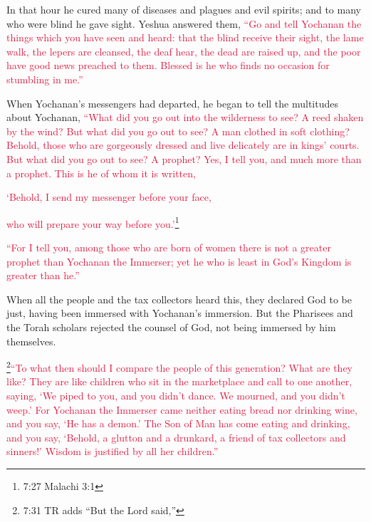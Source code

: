 \myverse{}In that hour he cured many of diseases and plagues and evil spirits;
and to many who were blind he gave sight.
\myverse{}Yeshua answered them,
\textcolor{crimson}{“Go and tell Yochanan the things which you have seen and heard: that the blind receive their sight,
	the lame walk, the lepers are cleansed, the deaf hear, the dead are raised up, and the poor have good
	news preached to them.
}
\myverse{}\textcolor{crimson}{Blessed is he who finds no occasion for stumbling in me.”}

\myverse{}When Yochanan’s messengers had departed, he began to tell the
multitudes about Yochanan,
\textcolor{crimson}{“What did you go out into the wilderness to see? A reed shaken by the wind?
}
\myverse{}\textcolor{crimson}{But what did you go out to see? A man clothed in soft clothing? Behold,
	those who are gorgeously dressed and live delicately are in kings’ courts.
}
\myverse{}\textcolor{crimson}{But what did you go out to see? A prophet? Yes, I tell you, and much more
	than a prophet.
}
\myverse{}\textcolor{crimson}{This is he of whom it is written,}

\textcolor{crimson}{‘Behold, I send my messenger before your face,}

\textcolor{crimson}{who will prepare your way before you.’}\footnote{ 7:27 Malachi 3:1}

\myverse{}\textcolor{crimson}{“For I tell you, among those who are born of women there
	is not a greater prophet than Yochanan the Immerser; yet he who is least in God’s Kingdom is greater than
	he.”}

\myverse{}When all the people and the tax collectors heard this, they declared
God to be just, having been immersed with Yochanan’s immersion.
\myverse{}But the Pharisees and the Torah scholars rejected the counsel of God, not
being immersed by him themselves.

\myverse{}\footnote{7:31 TR adds “But the Lord said,”}\textcolor{crimson}{“To what then should I compare the people of this generation?
	What are they like?
}
\myverse{}\textcolor{crimson}{They are like children who sit in the marketplace and call to one another,
	saying, ‘We piped to you, and you didn’t dance. We mourned, and you didn’t weep.’
}
\myverse{}\textcolor{crimson}{For Yochanan the Immerser came neither eating bread nor drinking wine,
	and you say, ‘He has a demon.’
}
\myverse{}\textcolor{crimson}{The Son of Man has come eating and drinking, and you say, ‘Behold, a glutton
	and a drunkard, a friend of tax collectors and sinners!’
}
\myverse{}\textcolor{crimson}{Wisdom is justified by all her children.”}

